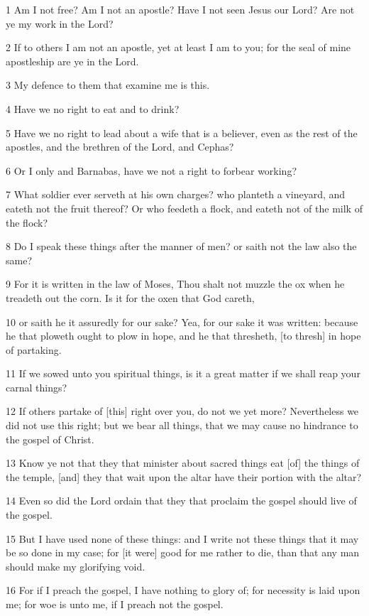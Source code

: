 \par 1 Am I not free? Am I not an apostle? Have I not seen Jesus our Lord? Are not ye my work in the Lord?
\par 2 If to others I am not an apostle, yet at least I am to you; for the seal of mine apostleship are ye in the Lord.
\par 3 My defence to them that examine me is this.
\par 4 Have we no right to eat and to drink?
\par 5 Have we no right to lead about a wife that is a believer, even as the rest of the apostles, and the brethren of the Lord, and Cephas?
\par 6 Or I only and Barnabas, have we not a right to forbear working?
\par 7 What soldier ever serveth at his own charges? who planteth a vineyard, and eateth not the fruit thereof? Or who feedeth a flock, and eateth not of the milk of the flock?
\par 8 Do I speak these things after the manner of men? or saith not the law also the same?
\par 9 For it is written in the law of Moses, Thou shalt not muzzle the ox when he treadeth out the corn. Is it for the oxen that God careth,
\par 10 or saith he it assuredly for our sake? Yea, for our sake it was written: because he that ploweth ought to plow in hope, and he that thresheth, [to thresh] in hope of partaking.
\par 11 If we sowed unto you spiritual things, is it a great matter if we shall reap your carnal things?
\par 12 If others partake of [this] right over you, do not we yet more? Nevertheless we did not use this right; but we bear all things, that we may cause no hindrance to the gospel of Christ.
\par 13 Know ye not that they that minister about sacred things eat [of] the things of the temple, [and] they that wait upon the altar have their portion with the altar?
\par 14 Even so did the Lord ordain that they that proclaim the gospel should live of the gospel.
\par 15 But I have used none of these things: and I write not these things that it may be so done in my case; for [it were] good for me rather to die, than that any man should make my glorifying void.
\par 16 For if I preach the gospel, I have nothing to glory of; for necessity is laid upon me; for woe is unto me, if I preach not the gospel.
